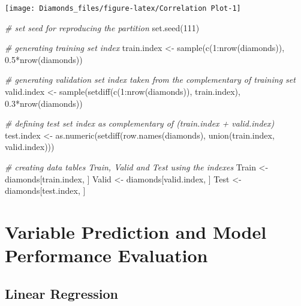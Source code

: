 \documentclass[
]{article}
\newenvironment{Shaded}{\begin{snugshade}}{\end{snugshade}}
\newcommand{\CommentTok}[1]{\textcolor[rgb]{0.56,0.35,0.01}{\textit{#1}}}
\newcommand{\DecValTok}[1]{\textcolor[rgb]{0.00,0.00,0.81}{#1}}
\newcommand{\FloatTok}[1]{\textcolor[rgb]{0.00,0.00,0.81}{#1}}
\newcommand{\FunctionTok}[1]{\textcolor[rgb]{0.00,0.00,0.00}{#1}}
\newcommand{\NormalTok}[1]{#1}
\newcommand{\OtherTok}[1]{\textcolor[rgb]{0.56,0.35,0.01}{#1}}
\newcommand{\SpecialCharTok}[1]{\textcolor[rgb]{0.00,0.00,0.00}{#1}}
\begin{document}
\begin{center}\texttt{[image: Diamonds\_files/figure-latex/Correlation Plot-1]} \end{center}

\begin{Shaded}
\begin{Highlighting}[]
\CommentTok{\# set seed for reproducing the partition}
\FunctionTok{set.seed}\NormalTok{(}\DecValTok{111}\NormalTok{)}

\CommentTok{\# generating training set index}
\NormalTok{train.index }\OtherTok{\textless{}{-}} \FunctionTok{sample}\NormalTok{(}\FunctionTok{c}\NormalTok{(}\DecValTok{1}\SpecialCharTok{:}\FunctionTok{nrow}\NormalTok{(diamonds)), }\FloatTok{0.5}\SpecialCharTok{*}\FunctionTok{nrow}\NormalTok{(diamonds))}

\CommentTok{\# generating validation set index taken from the complementary of training set}
\NormalTok{valid.index }\OtherTok{\textless{}{-}} \FunctionTok{sample}\NormalTok{(}\FunctionTok{setdiff}\NormalTok{(}\FunctionTok{c}\NormalTok{(}\DecValTok{1}\SpecialCharTok{:}\FunctionTok{nrow}\NormalTok{(diamonds)), train.index), }\FloatTok{0.3}\SpecialCharTok{*}\FunctionTok{nrow}\NormalTok{(diamonds))}

\CommentTok{\# defining test set index as complementary of (train.index + valid.index)}
\NormalTok{test.index }\OtherTok{\textless{}{-}} \FunctionTok{as.numeric}\NormalTok{(}\FunctionTok{setdiff}\NormalTok{(}\FunctionTok{row.names}\NormalTok{(diamonds), }\FunctionTok{union}\NormalTok{(train.index, valid.index)))}

\CommentTok{\# creating data tables Train, Valid and Test using the indexes}
\NormalTok{Train }\OtherTok{\textless{}{-}}\NormalTok{ diamonds[train.index, ]}
\NormalTok{Valid }\OtherTok{\textless{}{-}}\NormalTok{ diamonds[valid.index, ]}
\NormalTok{Test }\OtherTok{\textless{}{-}}\NormalTok{ diamonds[test.index, ]}
\end{Highlighting}
\end{Shaded}

\hypertarget{variable-prediction-and-model-performance-evaluation}{%
\section{Variable Prediction and Model Performance
Evaluation}\label{variable-prediction-and-model-performance-evaluation}}

\hypertarget{linear-regression}{%
\subsection{Linear Regression}\label{linear-regression}}
\end{document}
